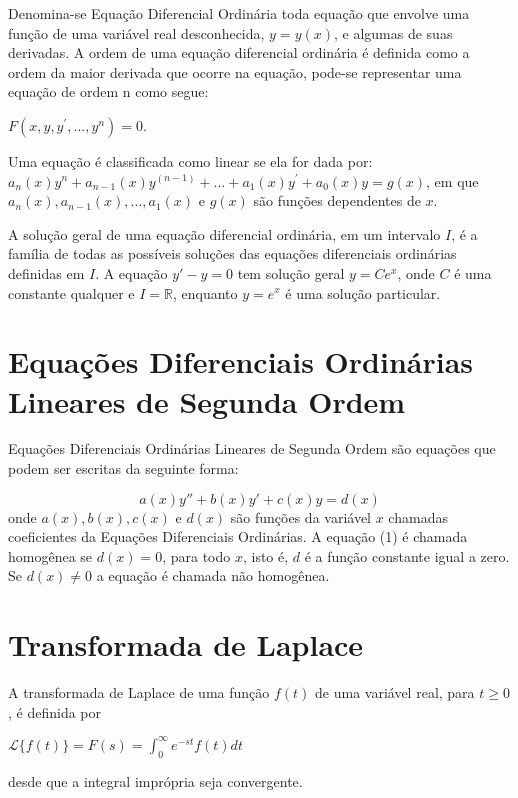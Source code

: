 \documentclass[10pt,twoside,a4paper]{article}
\begin{document}
Denomina-se Equação Diferencial Ordinária toda equação que envolve uma função de uma variável real desconhecida, $ y = y(x) $, e algumas de suas derivadas. A ordem de uma equação diferencial ordinária é definida como a ordem da maior derivada que ocorre na equação, pode-se representar uma equação de ordem n como segue:

\begin{center}
$\displaystyle F(x,y,y^{\prime},..., y^{n}) = 0$.
\end{center}
Uma equação é classificada como linear se ela for dada por: $\displaystyle a_n(x)y^{n} + a_{n-1}(x)y^{(n-1)} + ... + a_1(x)y^{\prime} + a_0(x)y = g(x)$, em que $a_n(x), a_{n-1}(x), ..., a_1(x)$ e $g(x)$ são funções dependentes de $x$. 

A solução geral de uma equação diferencial ordinária, em um intervalo $I$, é a família de todas as possíveis soluções das equações diferenciais ordinárias definidas em $I$. A equação $ y' - y = 0$ tem solução geral $ y = Ce^x $, onde $C$ é uma constante qualquer e $ I = \mathbb{R} $, enquanto $ y = e^x $ é uma solução particular.

\section{Equações Diferenciais Ordinárias Lineares de Segunda Ordem}

Equações Diferenciais Ordinárias Lineares de Segunda Ordem são equações que podem ser escritas da seguinte forma:

\begin{equation}
a(x)y'' + b(x)y' + c(x)y = d(x)
\end{equation}
onde $a(x), b(x), c(x)$ e $d(x)$ são funções da variável $x$ chamadas coeficientes da Equações Diferenciais Ordinárias. A equação (1) é chamada homogênea se $d(x) = 0$, para todo $x$, isto é, $d$ é a função constante igual a zero. Se $d(x) \neq 0$ a equação é chamada não homogênea.

\section{Transformada de Laplace}

A transformada de Laplace de uma função $f(t)$ de uma variável real, para $t \geq 0$, é definida por

\begin{center}
$ \mathcal{L}\{f(t)\} = F(s) = \displaystyle \int^{\infty}_{0} e^{-st}f(t)dt$
\end{center}
desde que a integral imprópria seja convergente.
\end{document}
